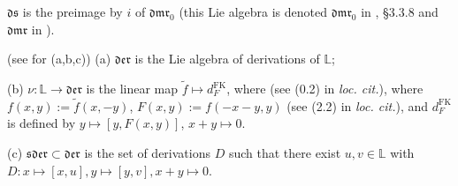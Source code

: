 \documentclass[10pt]{amsart}
\numberwithin{equation}{subsection}
\begin{document}


\begin{defn}\label{def:ds}
  $\mathfrak{ds}$ %
is the preimage by $i$ of 
$\mathfrak{dmr}_0$ %
(this Lie algebra is denoted  $\mathfrak{dmr}_0$ in 
 \cite{R}, §3.3.8 and $\mathfrak{dmr}$ in \cite{FK}).   
\end{defn}

\begin{defn} (see  \cite{FK} for (a,b,c))
 (a) $\mathfrak{der}$ is the Lie algebra of derivations of $\mathbb L$; 

(b) $\nu : \mathbb L\to \mathfrak{der}$ is the linear map $\tilde f\mapsto d_F^{\mathrm{FK}}$, where 
(see (0.2) in {\it loc. cit.}), where $f(x,y):=\tilde f(x,-y)$, $F(x,y):=f(-x-y,y)$ (see (2.2) in {\it loc. cit.}), 
and $d_F^{\mathrm{FK}}$ is defined by $y\mapsto [y,F(x,y)]$, $x+y\mapsto 0$. 

(c) $\mathfrak{sder}\subset\mathfrak{der}$ is the set of derivations $D$ such that there 
exist $u,v\in \mathbb L$ with $D : x\mapsto [x,u],y\mapsto [y,v], x+y\mapsto 0$. 
\end{defn}
\end{document}
